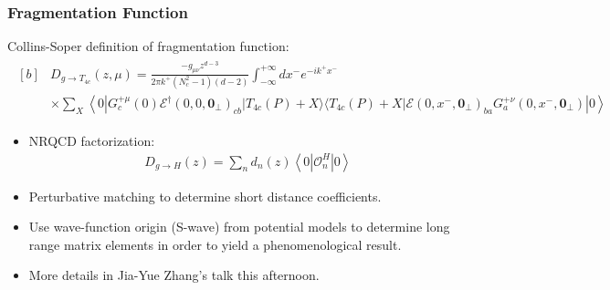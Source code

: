 \begin{frame}
  \frametitle{Fragmentation Function}

  Collins-Soper definition of fragmentation function:
  {\footnotesize
  \begin{align*}
    \begin{aligned}[b]
       & D_{g \rightarrow T_{4c}}(z, \mu)= \frac{-g_{\mu \nu} z^{d-3}}{2 \pi k^{+}\left(N_{c}^{2}-1\right)(d-2)} \int_{-\infty}^{+\infty} d x^{-} e^{-i k^{+} x^{-}}
      \\
       & \times\sum_X \left\langle 0\left|G_{c}^{+\mu}(0) \mathcal{E}^{\dagger}\left(0,0, \mathbf{0}_{\perp}\right)_{c b}
      |T_{4c}(P)+X\rangle\langle T_{4c}(P)+X| \mathcal{E}\left(0, x^{-}, \mathbf{0}_{\perp}\right)_{b a} G_{a}^{+\nu}\left(0, x^{-}, \mathbf{0}_{\perp}\right)\right| 0\right\rangle
      \label{CS:def:gluon:T4c:frag}
    \end{aligned}
  \end{align*}}
  \begin{minipage}{0.49\textwidth}
    {\small\begin{itemize}
        \item NRQCD factorization:
              \begin{align*}
                D_{g \rightarrow H}(z)=\sum_{n} d_{n}(z)\left\langle 0\left|\mathcal{O}_{n}^{H}\right| 0\right\rangle
              \end{align*}
        \item Perturbative matching to determine short distance coefficients.
        \item Use wave-function origin (S-wave) from potential models to determine long range matrix elements in order to yield a phenomenological result.
        \item More details in Jia-Yue Zhang's talk this afternoon.
      \end{itemize}}
  \end{minipage}\hfill
  \begin{minipage}{0.45\textwidth}
    \begin{figure}[hbtp]
      \centering
\end{figure}
\end{minipage}
\end{frame}
